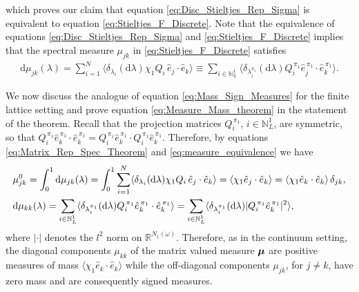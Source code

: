 \documentclass{cmslatex}
\renewcommand{\d}{\text{d}}
\newcommand\bmu{\mbox{\boldmath${\mu}$}}
\begin{document}
%
which proves our
claim that equation \eqref{eq:Disc_Stieltjes_Rep_Sigma} is 
equivalent to equation \eqref{eq:Stieltjes_F_Discrete}. Note
that the equivalence of equations \eqref{eq:Disc_Stieltjes_Rep_Sigma}
and \eqref{eq:Stieltjes_F_Discrete} implies that the spectral 
measure $\mu_{jk}$ in \eqref{eq:Stieltjes_F_Discrete} satisfies 
%
\begin{align}\label{eq:measure_equivalence} 
  \d\mu_{jk}(\lambda)=\sum_{i=1}^N \langle\delta_{\lambda_i}(\d\lambda)\chi_1Q_i\,\hat{e}_j\cdot\hat{e}_k\rangle
         \equiv\sum_{i\in\mathbb{N}_L^1}
          \langle\delta_{\lambda_i^{\pi_1}}(\d\lambda)Q_i^{\,\pi_1}\hat{e}_j^{\,\pi_1}\cdot\hat{e}_k^{\,\pi_1}\rangle.
\end{align}
%

We now discuss the analogue of equation \eqref{eq:Mass_Sign_Measures}
for the finite lattice setting and prove equation
\eqref{eq:Measure_Mass_theorem} in the statement of the
theorem. Recall that the projection matrices $Q_i^{\,\pi_1}$,
$i\in\mathbb{N}_L^1$, are symmetric, so that
$Q_i^{\,\pi_1}\hat{e}_k^{\,\pi_1}\cdot\hat{e}_k^{\,\pi_1}
=Q_i^{\,\pi_1}\hat{e}_k^{\,\pi_1}\cdot Q_i^{\,\pi_1}\hat{e}_k^{\,\pi_1}$. Therefore,
by equations \eqref{eq:Matrix_Rep_Spec_Theorem} and
\eqref{eq:measure_equivalence} we have   
%
\begin{align}\label{eq:Measure_Mass_Lattice}
  &\mu^0_{jk}=\int_0^1\d\mu_{jk}(\lambda)
       =\int_0^1\sum_{i=1}^N \langle\delta_{\lambda_i}(\d\lambda)\chi_1Q_i\,\hat{e}_j\cdot\hat{e}_k\rangle
       =\langle\chi_1\hat{e}_j\cdot\hat{e}_k\rangle
       =\langle\chi_1\hat{e}_k\cdot\hat{e}_k\rangle\,\delta_{jk}, \notag\\
 &\d\mu_{kk}(\lambda)=\sum_{i\in\mathbb{N}_L^1}
             \langle\delta_{\lambda_i^{\pi_1}}(\d\lambda)Q_i^{\,\pi_1}\hat{e}_k^{\,\pi_1}\cdot\hat{e}_k^{\,\pi_1}\rangle
         =\sum_{i\in\mathbb{N}_L^1}
             \langle\delta_{\lambda_i^{\pi_1}}(\d\lambda)|Q_i^{\,\pi_1}\hat{e}_k^{\,\pi_1}|^2\rangle,            
\end{align}
%
where $|\cdot|$ denotes the $l^2$ norm on $\mathbb{R}^{N_1(\omega)}$.
Therefore, as in the continuum setting, the diagonal components
$\mu_{kk}$ of the matrix valued measure $\bmu$ are positive measures of
mass $\langle\chi_1\hat{e}_k\cdot\hat{e}_k\rangle$ while the off-diagonal components
$\mu_{jk}$, for $j\neq k$, have zero mass and are consequently signed
measures.
\end{document}
